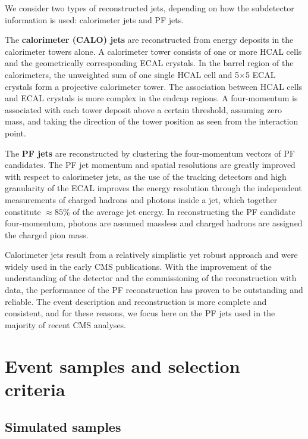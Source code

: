 \documentclass[11pt,twoside,a4paper,cmspaper,final,collab]{cms-tdr}
\begin{document}
We consider two types of reconstructed jets, depending on how the subdetector information is used: calorimeter jets and PF jets.

The \textbf{calorimeter (CALO) jets} are reconstructed from energy deposits in the calorimeter towers alone. A calorimeter tower consists of one or more HCAL
cells and the geometrically corresponding ECAL crystals.
In the barrel region of the calorimeters, the unweighted sum of one single HCAL cell and 5$\times $5 ECAL crystals form a projective calorimeter tower.
The association between HCAL cells and ECAL crystals is more complex in the endcap regions.
A four-momentum is associated with each tower deposit above a certain threshold, assuming zero mass, and taking
 the direction of the tower position as seen from the interaction point.

The \textbf{PF jets} are reconstructed by clustering the four-momentum vectors of PF candidates. The PF jet momentum and spatial resolutions
are greatly improved with respect to calorimeter jets, as the use of the tracking detectors and high granularity of the ECAL
improves the energy resolution through the independent measurements of
charged hadrons and photons inside a jet, which together constitute ${\approx}85$\% of the average jet energy.
In reconstructing the PF candidate four-momentum, photons are assumed massless and charged hadrons are assigned the charged pion mass.

Calorimeter jets result from a relatively simplistic yet robust approach and were widely used in the early CMS publications.
With the improvement of the understanding of the detector and the commissioning of the reconstruction with data,
the performance of the PF reconstruction has proven to be outstanding and reliable.
The event description and reconstruction is more complete and consistent, and for these reasons, we focus here on the PF jets used in the majority of recent CMS analyses.

\section{Event samples and selection criteria}
\label{sec:datasets}

\subsection{Simulated samples}
\end{document}
